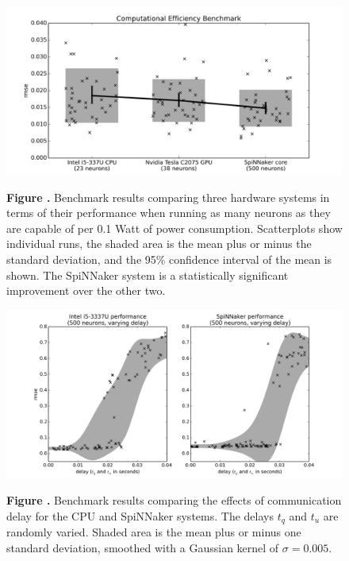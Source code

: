 \documentclass{frontiersSCNS} %
\begin{document}
\begin{figure}[h!]
\begin{center}
\includegraphics[width=18cm]{figures/plot_power}
\end{center}
 \textbf{\label{fig:analysis_power} Figure .}{ Benchmark results comparing three hardware systems
     in terms of their performance when running as many neurons as they are capable of per 0.1 Watt of power consumption.  Scatterplots show individual runs, the 
     shaded area is the mean plus or minus the standard deviation, and the 95\% confidence interval of the mean is shown.  The SpiNNaker system is a statistically
 significant improvement over the other two.}
\end{figure}

\begin{figure}[h!]
\begin{center}
\includegraphics[width=18cm]{figures/plot_delay}
\end{center}
 \textbf{\label{fig:analysis_delay} Figure .}{ Benchmark results comparing the effects
     of communication delay for the CPU and SpiNNaker systems.  The delays $t_q$ and $t_u$ are randomly varied.  Shaded
 area is the mean plus or minus one standard deviation, smoothed with a Gaussian kernel of $\sigma=0.005$.}
\end{figure}
\end{document}

